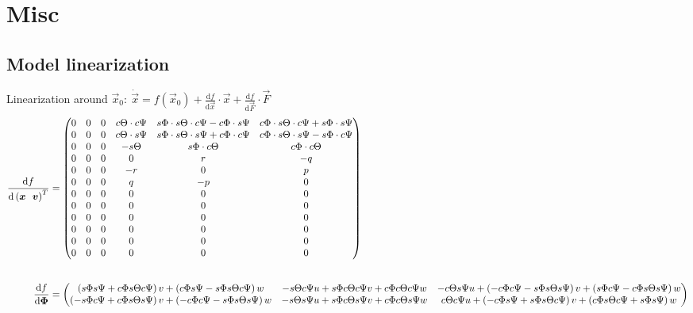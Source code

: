 \section{Misc}

\subsection{Model linearization}
Linearization around $\vec{x}_0:~\dot{\vec{x}} = f(\vec{x}_0) + \frac{\text{d}f}{\text{d}\vec{x}} \cdot \vec{x} + \frac{\text{d}f}{\text{d}\vec{F}} \cdot \vec{F}$
\begin{align*}
\frac{\text{d}f}{\text{d} \left( \boldsymbol{x} ~~ \boldsymbol{v} \right)^T } &= 
\begin{pmatrix}
0 & 0 & 0 & c{\Theta} \cdot c{\Psi}  & s{\Phi} \cdot s{\Theta} \cdot c{\Psi} - c{\Phi} \cdot s{\Psi}  & c{\Phi} \cdot s{\Theta} \cdot c{\Psi} +  s{\Phi} \cdot s{\Psi}
\\
0 & 0 & 0 & c{\Theta}\cdot s{\Psi}  & s{\Phi} \cdot s{\Theta} \cdot s{\Psi} + c{\Phi} \cdot c{\Psi} & c{\Phi} \cdot s{\Theta} \cdot s{\Psi} - s{\Phi} \cdot c{\Psi}
\\
0 & 0 & 0 & -s{\Theta}  & s{\Phi} \cdot c{\Theta}  & c{\Phi} \cdot c{\Theta} 
\\
0 & 0 & 0 & 0 & r & -q
\\
0 & 0 & 0 & -r & 0 & p
\\
0 & 0 & 0 & q & -p & 0
\\
0 & 0 & 0 & 0 & 0 & 0
\\
0 & 0 & 0 & 0 & 0 & 0
\\
0 & 0 & 0 & 0 & 0 & 0
\\
0 & 0 & 0 & 0 & 0 & 0
\\
0 & 0 & 0 & 0 & 0 & 0
\\
0 & 0 & 0 & 0 & 0 & 0
\end{pmatrix} 
\\[2em]
\frac{\text{d}f}{\text{d} \boldsymbol{\Phi}} &= \begin{pmatrix} 
\left(s\Phi s\Psi + c\Phi s\Theta c\Psi \right)  v + \left(c\Phi s\Psi -s\Phi s\Theta c\Psi \right)  w & -s\Theta c\Psi u + s\Phi c\Theta c\Psi v + c\Phi c\Theta c\Psi w & - c\Theta s\Psi u + \left( - c\Phi c\Psi  -s\Phi s\Theta s\Psi \right) v + \left(s\Phi c\Psi - c\Phi s\Theta s\Psi \right) w 
\\
\left(-s{\Phi}c{\Psi} + c{\Phi}s{\Theta}s{\Psi} \right) v + \left( -c{\Phi}c{\Psi} - s{\Phi}s{\Theta}s{\Psi} \right) w & -s{\Theta} s{\Psi} u + s{\Phi}c{\Theta}s{\Psi} v + c{\Phi}c{\Theta}s{\Psi} w  & c{\Theta}c{\Psi} u + \left( - c{\Phi}s{\Psi} + s{\Phi}s{\Theta}c{\Psi}\right)v + \left(c{\Phi}s{\Theta}c{\Psi} + s{\Phi}s{\Psi} \right)w 
\\

\end{pmatrix}
\end{align*}
